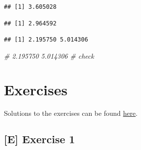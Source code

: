 \documentclass[
]{book}
\newenvironment{Shaded}{\begin{snugshade}}{\end{snugshade}}
\newcommand{\AttributeTok}[1]{\textcolor[rgb]{0.13,0.29,0.53}{#1}}
\newcommand{\CommentTok}[1]{\textcolor[rgb]{0.56,0.35,0.01}{\textit{#1}}}
\newcommand{\ConstantTok}[1]{\textcolor[rgb]{0.56,0.35,0.01}{#1}}
\newcommand{\DecValTok}[1]{\textcolor[rgb]{0.00,0.00,0.81}{#1}}
\newcommand{\FloatTok}[1]{\textcolor[rgb]{0.00,0.00,0.81}{#1}}
\newcommand{\FunctionTok}[1]{\textcolor[rgb]{0.13,0.29,0.53}{\textbf{#1}}}
\newcommand{\NormalTok}[1]{#1}
\newcommand{\SpecialCharTok}[1]{\textcolor[rgb]{0.81,0.36,0.00}{\textbf{#1}}}
\begin{document}
\begin{verbatim}
## [1] 3.605028
\end{verbatim}

\begin{Shaded}
\end{Shaded}

\begin{verbatim}
## [1] 2.964592
\end{verbatim}

\begin{Shaded}
\end{Shaded}

\begin{verbatim}
## [1] 2.195750 5.014306
\end{verbatim}

\begin{Shaded}
\begin{Highlighting}[]
\CommentTok{\# 2.195750 5.014306 \# check}
\end{Highlighting}
\end{Shaded}

\section{Exercises}\label{exercises}

Solutions to the exercises can be found
\href{https://github.com/jdegenfellner/Script_QM3_ZHAW/tree/main/Solutions_Exercises}{here}.

\subsection{{[}E{]} Exercise 1}\label{exercise1}
\end{document}
